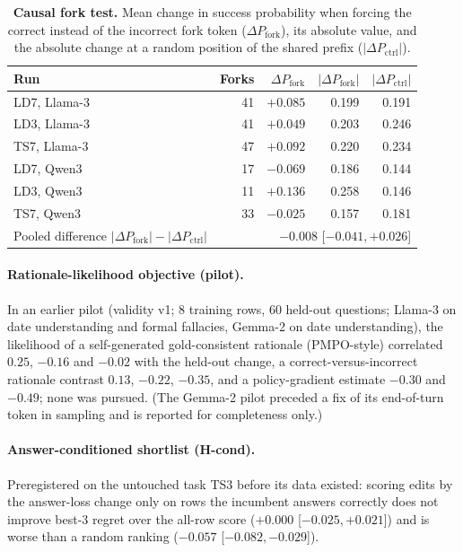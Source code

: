 \documentclass{article}
\begin{document}
\begin{table}[h]
\centering
\caption{\textbf{Causal fork test.} Mean change in success probability when forcing the
correct instead of the incorrect fork token ($\Delta P_{\text{fork}}$), its absolute value,
and the absolute change at a random position of the shared prefix
($|\Delta P_{\text{ctrl}}|$).}
\label{tab:causal}
\small
\begin{tabular}{lrrrr}
\toprule
Run & Forks & $\Delta P_{\text{fork}}$ & $|\Delta P_{\text{fork}}|$ & $|\Delta P_{\text{ctrl}}|$ \\
\midrule
LD7, Llama-3 & 41 & $+0.085$ & 0.199 & 0.191 \\
LD3, Llama-3 & 41 & $+0.049$ & 0.203 & 0.246 \\
TS7, Llama-3 & 47 & $+0.092$ & 0.220 & 0.234 \\
LD7, Qwen3 & 17 & $-0.069$ & 0.186 & 0.144 \\
LD3, Qwen3 & 11 & $+0.136$ & 0.258 & 0.146 \\
TS7, Qwen3 & 33 & $-0.025$ & 0.157 & 0.181 \\
\midrule
Pooled difference $|\Delta P_{\text{fork}}|-|\Delta P_{\text{ctrl}}|$ & \multicolumn{4}{r}{$-0.008$ [$-0.041,+0.026$]} \\
\bottomrule
\end{tabular}
\end{table}

\paragraph{Rationale-likelihood objective (pilot).} In an earlier pilot (validity v1; 8
training rows, 60 held-out questions; Llama-3 on date understanding and formal fallacies,
Gemma-2 on date understanding), the likelihood of a self-generated gold-consistent
rationale (PMPO-style) correlated $0.25$, $-0.16$ and $-0.02$ with the held-out change,
a correct-versus-incorrect rationale contrast $0.13$, $-0.22$, $-0.35$, and a policy-gradient
estimate $-0.30$ and $-0.49$; none was pursued. (The Gemma-2 pilot preceded a fix of its
end-of-turn token in sampling and is reported for completeness only.)

\paragraph{Answer-conditioned shortlist (H-cond).} Preregistered on the untouched task
TS3 before its data existed: scoring edits by the answer-loss change only on rows the
incumbent answers correctly does not improve best-3 regret over the all-row score ($+0.000$
[$-0.025,+0.021$]) and is worse than a random ranking ($-0.057$ [$-0.082,-0.029$]).
\end{document}
